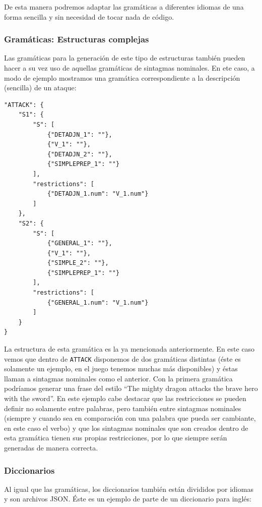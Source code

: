 De esta manera podremos adaptar las gramáticas a diferentes idiomas de una forma sencilla y sin necesidad de tocar nada de código.

\subsubsection{Gramáticas: Estructuras complejas}

Las gramáticas para la generación de este tipo de estructuras también pueden hacer a su vez uso de aquellas gramáticas de sintagmas nominales. En ete caso, a modo de ejemplo mostramos una gramática correspondiente a la descripción (sencilla) de un ataque: 

\begin{lstlisting}[style=json]
"ATTACK": {
	"S1": {
	    "S": [
	        {"DETADJN_1": ""},
	        {"V_1": ""},
	        {"DETADJN_2": ""},
	        {"SIMPLEPREP_1": ""}
	    ],
	    "restrictions": [
	        {"DETADJN_1.num": "V_1.num"}
	    ]
	},
	"S2": {
	    "S": [
	        {"GENERAL_1": ""},
	        {"V_1": ""},
	        {"SIMPLE_2": ""},
	        {"SIMPLEPREP_1": ""}
	    ],
	    "restrictions": [
	        {"GENERAL_1.num": "V_1.num"}
	    ]
	}
}
\end{lstlisting}

\noindent La estructura de esta gramática es la ya mencionada anteriormente. En este caso vemos que dentro de \texttt{ATTACK} disponemos de dos gramáticas distintas (éste es solamente un ejemplo, en el juego tenemos muchas más disponibles) y éstas llaman a sintagmas nominales como el anterior.
Con la primera gramática podríamos generar una frase del estilo ``The mighty dragon attacks the brave hero with the sword''. En este ejemplo cabe destacar que las restricciones se pueden definir no solamente entre palabras, pero también entre sintagmas nominales (siempre y cuando sea en comparación con una palabra que pueda ser cambiante, en este caso el verbo) y que los sintagmas nominales que son creados dentro de esta gramática tienen sus propias restricciones, por lo que siempre serán generadas de manera correcta.

\subsubsection{Diccionarios}

Al igual que las gramáticas, los diccionarios también están divididos por idiomas y son archivos JSON. Éste es un ejemplo de parte de un diccionario para inglés:

